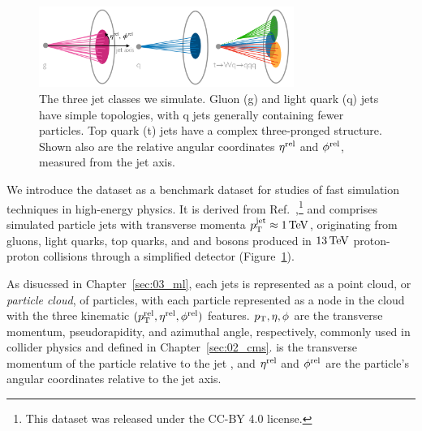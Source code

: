 \section{\texorpdfstring{\jetnet}{JetNet}}
\label{sec:04_jetnet_dataset}

\begin{figure}[t!]
    \centering
    \includegraphics[width=0.74\textwidth]{figures/04-ML4Sim/jets/jetcartoon.pdf}
    \caption[The three jet classes we simulate.]{
    The three jet classes we simulate. 
    Gluon (g) and light quark (q) jets have simple topologies, with q jets generally containing fewer particles. 
    Top quark (t) jets have a complex three-pronged structure.
    Shown also are the relative angular coordinates $\eta^\mathrm{rel}$ and $\phi^\mathrm{rel}$, measured from the jet axis.}
    \label{fig:04_jetcartoon}
\end{figure}

We introduce the \jetnet dataset as a benchmark dataset for studies of fast simulation techniques in high-energy physics.
It is derived from Ref.~\cite{hls4mldata_150p},\footnote{This dataset was released under the CC-BY 4.0 license.} and comprises simulated particle jets with transverse momenta $p_\mathrm{T}^\mathrm{jet}\approx 1\,\text{Te\hspace{-.08em}V}$, originating from gluons, light quarks, top quarks, and \PW and \PZ bosons produced in $13\,\text{Te\hspace{-.08em}V}$ proton-proton collisions through a simplified detector (Figure~\ref{fig:04_jetcartoon}).

As disucssed in Chapter~\ref{sec:03_ml}, each jets is represented as a point cloud, or \textit{particle cloud}, of particles, with each particle represented as a node in the cloud with the three kinematic $(p_\mathrm{T}^\mathrm{rel}, \eta^\mathrm{rel}, \phi^\mathrm{rel})$ features.
$p_\mathrm{T}, \eta, \phi$ are the transverse momentum, pseudorapidity, and azimuthal angle, respectively, commonly used in collider physics and defined in Chapter~\ref{sec:02_cms}.
\ptrel is the transverse momentum of the particle relative to the jet \pt, and $\eta^\mathrm{rel}$ and $\phi^\mathrm{rel}$ are the particle's angular coordinates relative to the jet axis.


